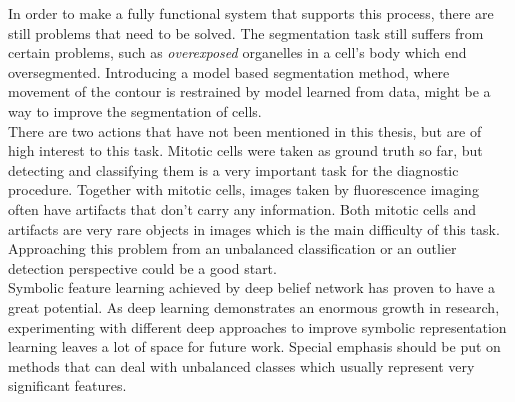 In order to make a fully functional system that supports this process, there are still problems that need to be solved. The segmentation task still suffers from certain problems, such as \textit{overexposed} organelles in a cell's body which end oversegmented. Introducing a model based segmentation method, where movement of the contour is restrained by model learned from data, might be a way to improve the segmentation of cells. \\

There are two actions that have not been mentioned in this thesis, but are of high interest to this task. Mitotic cells were taken as ground truth so far, but detecting and classifying them is a very important task for the diagnostic procedure. Together with mitotic cells, images taken by fluorescence imaging often have artifacts that don't carry any information. Both mitotic cells and artifacts are very rare objects in images which is the main difficulty of this task. Approaching this problem from an unbalanced classification or an outlier detection perspective could be a good start. \\

Symbolic feature learning achieved by deep belief network has proven to have a great potential. As deep learning demonstrates an enormous growth in research, experimenting with different deep approaches to improve symbolic representation learning leaves a lot of space for future work. Special emphasis should be put on methods that can deal with unbalanced classes which usually represent very significant features.